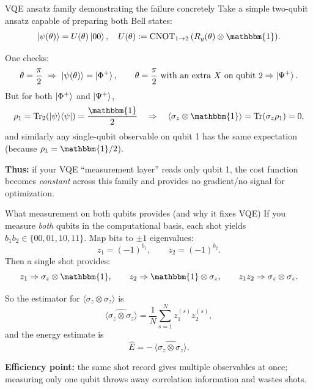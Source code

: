 \documentclass[aspectratio=169]{beamer}
\newcommand{\Z}{\sigma_z}
\newcommand{\I}{\mathbbm{1}}
\begin{document}
\begin{frame}{VQE ansatz family demonstrating the failure concretely}
Take a simple two-qubit ansatz capable of preparing both Bell states:
\[
\ket{\psi(\theta)} = U(\theta)\ket{00},
\quad
U(\theta) := \mathrm{CNOT}_{1\to 2}\,(R_y(\theta)\otimes \I).
\]

One checks:
\[
\theta=\frac{\pi}{2}\ \Rightarrow\ \ket{\psi(\theta)}=\ket{\Phi^+},
\qquad
\theta=\frac{\pi}{2}\ \text{with an extra }X\text{ on qubit 2}\Rightarrow \ket{\Psi^+}.
\]
\medskip
But for both \(\ket{\Phi^+}\) and \(\ket{\Psi^+}\),
\[
\rho_1=\Tr_2(\ket{\psi}\!\bra{\psi})=\frac{\I}{2}
\quad\Rightarrow\quad
\langle \Z\otimes\I\rangle = \Tr(\Z\rho_1)=0,
\]
and similarly any single-qubit observable on qubit 1 has the same expectation (because \(\rho_1=\I/2\)).

\medskip
\textbf{Thus:} if your VQE ``measurement layer'' reads only qubit 1, the cost function becomes \emph{constant} across this family and provides no gradient/no signal for optimization.
\end{frame}

\begin{frame}{What measurement on both qubits provides (and why it fixes VQE)}
If you measure \emph{both} qubits in the computational basis, each shot yields \(b_1b_2\in\{00,01,10,11\}\).
Map bits to \(\pm 1\) eigenvalues:
\[
z_1=(-1)^{b_1},\qquad z_2=(-1)^{b_2}.
\]
Then a single shot provides:
\[
z_1 \Rightarrow \Z\otimes\I,\qquad
z_2 \Rightarrow \I\otimes\Z,\qquad
z_1z_2 \Rightarrow \Z\otimes\Z.
\]

\medskip
So the estimator for \(\langle \Z\otimes\Z\rangle\) is
\[
\widehat{\langle \Z\otimes\Z\rangle}=\frac{1}{N}\sum_{s=1}^N z_1^{(s)}z_2^{(s)},
\]
and the energy estimate is
\[
\hat{E} = -\,\widehat{\langle \Z\otimes\Z\rangle}.
\]

\medskip
\textbf{Efficiency point:} the same shot record gives multiple observables at once; measuring only one qubit throws away correlation information and wastes shots.
\end{frame}
\end{document}
